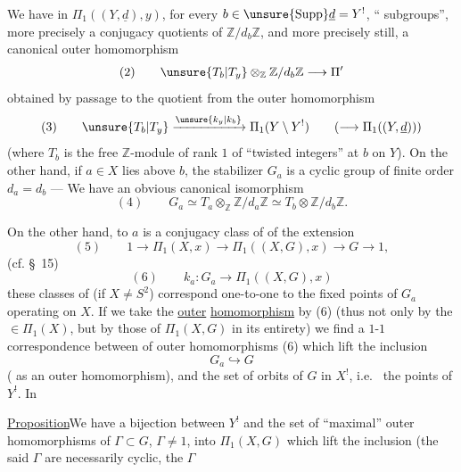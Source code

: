 We have in $\Pi_1((Y,\underline d),y)$, for every
$b\in\unsure{\operatorname{Supp}}\underline d=Y^!$,
`` subgroups'', more precisely
a conjugacy   
quotients of $\mathbb Z/d_b\mathbb Z$, and more precisely still,
a canonical outer homomorphism
\[
(2)\qquad
\unsure{T_b|T_y}\otimes_{\mathbb Z}\mathbb Z/d_b\mathbb Z
\longrightarrow\Pi'
\]
obtained by passage to the quotient from the outer homomorphism
\[
(3)\qquad
\unsure{T_b|T_y}\xrightarrow{\unsure{k_y|k_b}}
\Pi_1(Y\setminus Y^!)
\qquad(\longrightarrow\Pi_1((Y,\underline d)))
\]
(where $T_b$ is the free $\mathbb Z$-module of rank $1$ of
``twisted integers'' at $b$ on $Y$). On the other hand,
if $a\in X$ lies above $b$, the stabilizer $G_a$ is
 a cyclic group of finite order $d_a=d_b$
--- We have \unsure{$=$} an obvious canonical isomorphism
\[
(4)\qquad
G_a\simeq T_a\otimes_{\mathbb Z}\mathbb Z/d_a\mathbb Z
\simeq T_b\otimes\mathbb Z/d_b\mathbb Z.
\]


On the other hand, to $a$ is  a conjugacy
class of  of the extension
\[
(5)\qquad
1\longrightarrow\Pi_1(X,x)\longrightarrow\Pi_1((X,G),x)
\longrightarrow G\longrightarrow1,
\]
(cf. \S\ 15)
\[
(6)\qquad
k_a:G_a\longrightarrow\Pi_1((X,G),x)
\]
these classes 
of  (if $X\ne S^2$) correspond
one-to-one to the fixed points of $G_a$ operating on $X$.
If we take the \uline{outer} \uline{homomorphism} 
by (6) (thus  not only by the
$\in\Pi_1(X)$, but by those of $\Pi_1(X,G)$ in its entirety)
we find a $1$-$1$ correspondence between 
of outer homomorphisms (6) which lift the inclusion
\[
G_a\hookrightarrow G
\]
( as an outer homomorphism), and the set of orbits of $G$
in $X^!$, i.e.\  the points of $Y^!$. In 

\uline{Proposition}\quad We have a bijection between $Y^!$
and the set of ``maximal'' outer homomorphisms
of  $\Gamma\subset G$, 
$\Gamma\ne1$, into $\Pi_1(X,G)$ which lift the inclusion
 (the said $\Gamma$ are necessarily
cyclic, the $\Gamma$

